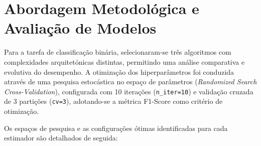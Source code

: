 \documentclass[12pt,a4paper]{article}
\begin{document}
\section{Abordagem Metodológica e Avaliação de Modelos}

Para a tarefa de classificação binária, selecionaram-se três algoritmos com complexidades arquitetónicas distintas, permitindo uma análise comparativa e evolutiva do desempenho. A otimização dos hiperparâmetros foi conduzida através de uma pesquisa estocástica no espaço de parâmetros (\textit{Randomized Search Cross-Validation}), configurada com 10 iterações (\texttt{n\_iter=10}) e validação cruzada de 3 partições (\texttt{cv=3}), adotando-se a métrica F1-Score como critério de otimização.

Os espaços de pesquisa e as configurações ótimas identificadas para cada estimador são detalhados de seguida:
\end{document}
